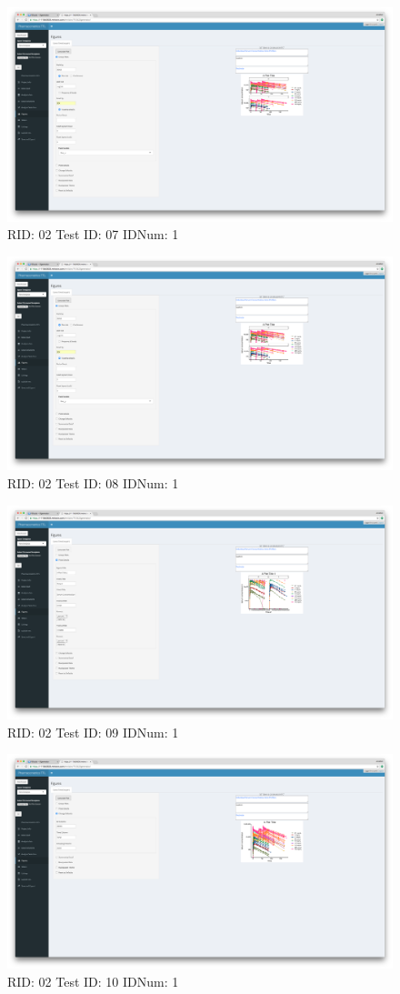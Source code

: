 \begin{figure}[H]
\includegraphics[width=.8\textwidth]{screencaps/02-07-1.png}
\caption{RID: 02 Test ID: 07 IDNum: 1}
\end{figure}
\begin{figure}[H]
\includegraphics[width=.8\textwidth]{screencaps/02-08-1.png}
\caption{RID: 02 Test ID: 08 IDNum: 1}
\end{figure}
\begin{figure}[H]
\includegraphics[width=.8\textwidth]{screencaps/02-09-1.png}
\caption{RID: 02 Test ID: 09 IDNum: 1}
\end{figure}
\begin{figure}[H]
\includegraphics[width=.8\textwidth]{screencaps/02-10-1.png}
\caption{RID: 02 Test ID: 10 IDNum: 1}
\end{figure}
